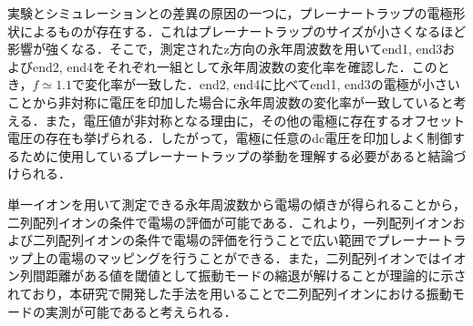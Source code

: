 実験とシミュレーションとの差異の原因の一つに，プレーナートラップの電極形状によるものが存在する．これはプレーナートラップのサイズが小さくなるほど影響が強くなる．そこで，測定されたz方向の永年周波数を用いてend1, end3およびend2, end4をそれぞれ一組として永年周波数の変化率を確認した．このとき，$f \simeq 1.1$で変化率が一致した．end2, end4に比べてend1, end3の電極が小さいことから非対称に電圧を印加した場合に永年周波数の変化率が一致していると考える．また，電圧値が非対称となる理由に，その他の電極に存在するオフセット電圧の存在も挙げられる．したがって，電極に任意のdc電圧を印加しよく制御するために使用しているプレーナートラップの挙動を理解する必要があると結論づけられる．

単一イオンを用いて測定できる永年周波数から電場の傾きが得られることから，二列配列イオンの条件で電場の評価が可能である．これより，一列配列イオンおよび二列配列イオンの条件で電場の評価を行うことで広い範囲でプレーナートラップ上の電場のマッピングを行うことができる．また，二列配列イオンではイオン列間距離がある値を閾値として振動モードの縮退が解けることが理論的に示されており\cite{Welzel_2011}，本研究で開発した手法を用いることで二列配列イオンにおける振動モードの実測が可能であると考えられる．